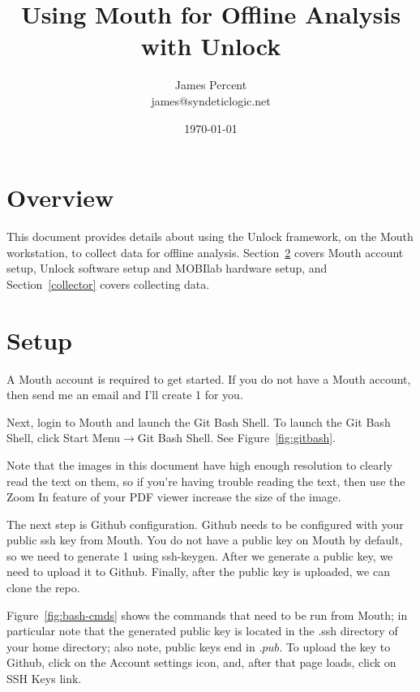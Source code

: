\documentclass[11pt]{article}
\begin{document}
\title{\textbf{Using Mouth for Offline Analysis with Unlock}}
\author{James Percent \\
  james@syndeticlogic.net}
\date{\today}
\parskip 11pt
\parindent 0pt


\maketitle


\section{Overview}

This document provides details about using the Unlock framework, on the Mouth workstation, to collect data for offline analysis.  Section~\ref{unlock} covers Mouth account setup, Unlock software setup and MOBIlab hardware setup, and Section~\ref{collector} covers collecting data.

\section{Setup}\label{unlock}

A Mouth account is required to get started.  If you do not have a Mouth account, then send me an email and I'll create 1 for you.  

Next, login to Mouth and launch the Git Bash Shell.  To launch the Git Bash Shell, click Start Menu$\rightarrow$Git Bash Shell.  See Figure~\ref{fig:gitbash}.  

Note that the images in this document have high enough resolution to clearly read the text on them, so if you're having trouble reading the text, then use the Zoom In feature of your PDF viewer increase the size of the image.

The next step is Github configuration.  Github needs to be configured with your public ssh key from Mouth.  You do not have a public key on Mouth by default, so we need to generate 1 using ssh-keygen.  After we generate a public key, we need to upload it to Github.  Finally, after the public key is uploaded, we can clone the repo.

Figure~\ref{fig:bash-cmds} shows the commands that need to be run from Mouth; in particular note that the generated public key is located in the .ssh directory of your home directory; also note, public keys end in $.pub$.  To upload the key to Github, click on the Account settings icon, and, after that page loads, click on SSH Keys link.
\end{document}
